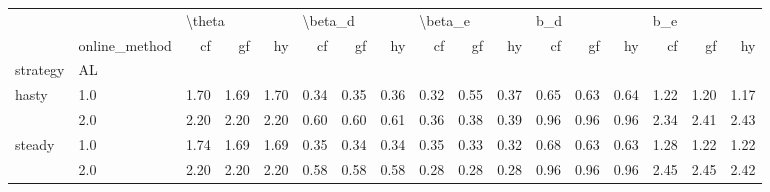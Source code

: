 \begin{tabular}{llrrrrrrrrrrrrrrr}
\toprule
       & {} & \multicolumn{3}{l}{\textbackslash theta} & \multicolumn{3}{l}{\textbackslash beta\_d} & \multicolumn{3}{l}{\textbackslash beta\_e} & \multicolumn{3}{l}{b\_d} & \multicolumn{3}{l}{b\_e} \\
       & online\_method &     cf &   gf &   hy &      cf &   gf &   hy &      cf &   gf &   hy &   cf &   gf &   hy &   cf &   gf &   hy \\
strategy & AL &        &      &      &         &      &      &         &      &      &      &      &      &      &      &      \\
\midrule
hasty & 1.0 &   1.70 & 1.69 & 1.70 &    0.34 & 0.35 & 0.36 &    0.32 & 0.55 & 0.37 & 0.65 & 0.63 & 0.64 & 1.22 & 1.20 & 1.17 \\
       & 2.0 &   2.20 & 2.20 & 2.20 &    0.60 & 0.60 & 0.61 &    0.36 & 0.38 & 0.39 & 0.96 & 0.96 & 0.96 & 2.34 & 2.41 & 2.43 \\
steady & 1.0 &   1.74 & 1.69 & 1.69 &    0.35 & 0.34 & 0.34 &    0.35 & 0.33 & 0.32 & 0.68 & 0.63 & 0.63 & 1.28 & 1.22 & 1.22 \\
       & 2.0 &   2.20 & 2.20 & 2.20 &    0.58 & 0.58 & 0.58 &    0.28 & 0.28 & 0.28 & 0.96 & 0.96 & 0.96 & 2.45 & 2.45 & 2.42 \\
\bottomrule
\end{tabular}
